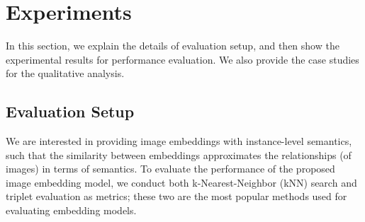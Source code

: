 \documentclass[sigconf]{acmart}
\begin{document}
\begin{comment}










In this section, we describe the model that generates phrases from image pixels. Our phrase generator consists of a ResNet-101 architecture \cite{he2016resnet} trained with web query-image pairs. The distinctive feature of this network is its ability to predict a large number of queries (40 million) from input images. In order to accommodate this large output space, we shrink the ResNet output to a 64-dimensional bottleneck layer. Our network can thus be conceptualized as containing three stages: the primary training mechanism consisting of learned weights and biases, a 64-dimensional feature layer representing image embeddings, and a softmax layer that produces a probability distribution across the 40 million queries. Such a decomposition is depicted in the phrase generation section of Figure~\ref{fig:pipeline}. Since handling such a large softmax is computationally challenging, we use sampled softmax, an important sampling technique for handling large output spaces that was first introduced in~\cite{JCMB2014}. (On using very large target vocabulary for neural machine translation)

At inference time, 64-dimensional embeddings are generated for each input image, and the top-3 most probable queries and their associated similarity scores are extracted from the query embedding index. As queries represent contextual information, such a procedure forms a powerful tool to identify relevant {\phrase} for arbitrary images without dependence on external sources. Furthermore, note that the embeddings additionally yield a way to measure image to image similarity in the query space.
\end{comment} 

\section{Experiments}
\label{sec:experiment}
In this section, we explain the details of evaluation setup, and then show the experimental results for performance evaluation. We also provide the case studies for the qualitative analysis.
\subsection{Evaluation Setup}
\label{subsec:Evaluation Setup}
We are interested in providing image embeddings with instance-level semantics, such that the similarity between embeddings approximates the relationships (of images) in terms of semantics. To evaluate the performance of the proposed image embedding model, we conduct both k-Nearest-Neighbor (kNN) search and triplet evaluation as metrics; these two are the most popular methods used for evaluating embedding models. 
\end{document}
